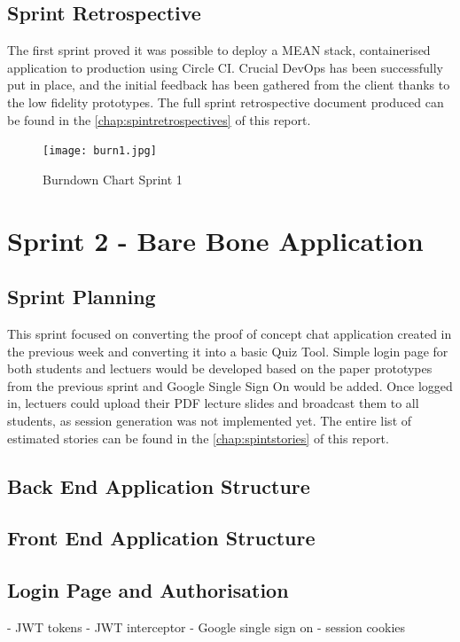 \subsection{Sprint Retrospective}
The first sprint proved it was possible to deploy a MEAN stack, containerised application
to production using Circle CI. Crucial DevOps has been successfully put in place, and the
initial feedback has been gathered from the client thanks to the low fidelity prototypes.
The full sprint retrospective document produced can be found in the \autoref{chap:spintretrospectives} of this report.

\begin{figure}[ht]
    \centering
    \texttt{[image: burn1.jpg]}
    \caption{Burndown Chart Sprint 1}
    \label{fig:burn1}
\end{figure}

\newpage
\section{Sprint 2 - Bare Bone Application}
\subsection{Sprint Planning}
This sprint focused on converting the proof of concept chat application created in the previous
week and converting it into a basic Quiz Tool. Simple login page for both students and lectuers
would be developed based on the paper prototypes from the previous sprint and Google Single Sign
On would be added. Once logged in, lectuers could upload their PDF lecture slides and broadcast
them to all students, as session generation was not implemented yet. The entire list of estimated stories
can be found in the \autoref{chap:spintstories} of this report.

\subsection{Back End Application Structure}

\subsection{Front End Application Structure}

\subsection{Login Page and Authorisation}
- JWT tokens
- JWT interceptor
- Google single sign on
- session cookies

